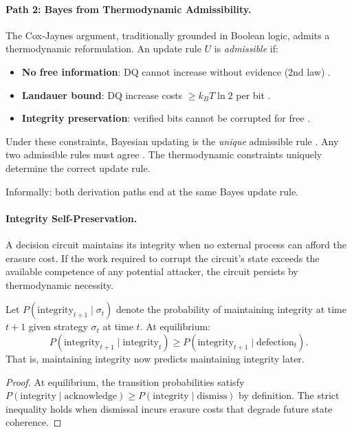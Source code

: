 \paragraph{Path 2: Bayes from Thermodynamic Admissibility.}
The Cox-Jaynes argument, traditionally grounded in Boolean logic, admits a thermodynamic reformulation. An update rule $U$ is \emph{admissible} if:
\begin{itemize}
  \item \textbf{No free information}: DQ cannot increase without evidence (2nd law) .
  \item \textbf{Landauer bound}: DQ increase costs $\geq k_B T \ln 2$ per bit .
  \item \textbf{Integrity preservation}: verified bits cannot be corrupted for free .
\end{itemize}
Under these constraints, Bayesian updating is the \emph{unique} admissible rule . Any two admissible rules must agree . The thermodynamic constraints uniquely determine the correct update rule.

Informally: both derivation paths end at the same Bayes update rule.

\paragraph{Integrity Self-Preservation.}
A decision circuit maintains its integrity when no external process can afford the erasure cost. If the work required to corrupt the circuit's state exceeds the available competence of any potential attacker, the circuit persists by thermodynamic necessity.

\begin{proposition}\label{prop:temporal-equilibrium}
Let $P(\text{integrity}_{t+1} \mid \sigma_t)$ denote the probability of maintaining integrity at time $t+1$ given strategy $\sigma_t$ at time $t$. At equilibrium:
\[
P(\text{integrity}_{t+1} \mid \text{integrity}_t) \ge P(\text{integrity}_{t+1} \mid \text{defection}_t).
\]
That is, maintaining integrity now predicts maintaining integrity later.
\end{proposition}

\begin{proof}
At equilibrium, the transition probabilities satisfy $P(\text{integrity} \mid \text{acknowledge}) \ge P(\text{integrity} \mid \text{dismiss})$ by definition. The strict inequality holds when dismissal incurs erasure costs that degrade future state coherence.
\end{proof}

